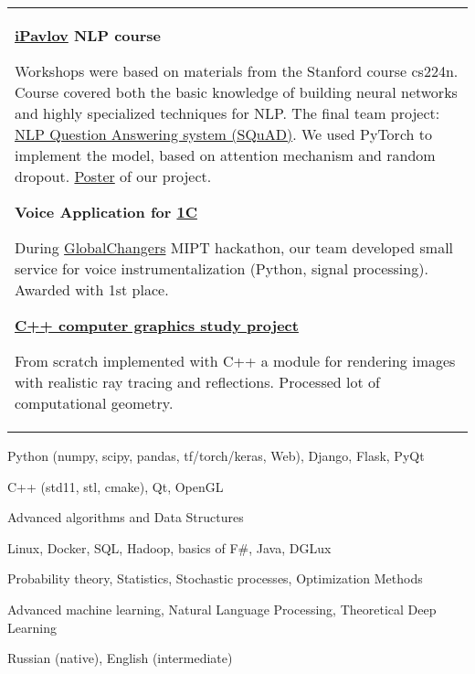 \documentclass[a4paper,12pt]{memoir} %
\newcommand{\opendialog}{\bluebullet}
\newcommand{\bullitem}[1]{\opendialog #1}
\begin{document}
	\begin{tabular}{p{} }
	\bullitem{ \textbf{\href{http://ipavlov.ai/\#edu}{iPavlov} NLP course} }
	
	Workshops were based on materials from the Stanford course cs224n. Course covered both the basic knowledge of building neural networks and highly specialized techniques for NLP. The final team project: \href{https://github.com/celidos/SQUAD_NLP}{NLP Question Answering system (SQuAD)}. We used PyTorch to implement the model, based on attention mechanism and random dropout. \href{https://github.com/celidos/SQUAD_NLP/blob/master/poster.pdf}{Poster} of our project.

	\SepSep
	\bullitem{\textbf{Voice Application for \href{http://1c.ru/eng/title.htm}{1C}}}
	
	During \href{https://github.com/celidos/hck_Global_Changers}{GlobalChangers} MIPT hackathon, our team developed small service for voice instrumentalization (Python, signal processing). Awarded with 1st place.\
	
	\SepSep
	\bullitem{\textbf{\href{https://github.com/celidos/programming-mipt-2015-2017/tree/master/RAY_TRACING}{C++ computer graphics study project}}} 
	
	From scratch implemented with C++ a module for rendering images with realistic ray tracing and reflections. Processed lot of computational geometry.
	
	\end{tabular}	

	\Sep
	
	
	\begin{figure*}[!htb]
	\begin{minipage}{0.45\textwidth}
		\begin{flushleft}
		
		\bullitem{Python (numpy, scipy, pandas, tf/torch/keras, Web), Django, Flask, PyQt}
		
		\bullitem{C++ (std11, stl, cmake), Qt, OpenGL}
		
		\bullitem{Advanced algorithms and Data Structures}
		
		\bullitem{Linux, Docker, SQL, Hadoop, basics of F\#, Java, DGLux}
	\end{flushleft}
	\end{minipage}\hfill	\begin{minipage}{0.45\textwidth}
		\begin{flushleft}
		
	\bullitem{Probability theory, Statistics, Stochastic processes, Optimization Methods}	
	
	\bullitem{Advanced machine learning, Natural Language Processing, Theoretical Deep Learning}
			
	\bullitem{Russian (native), English (intermediate)}
\end{flushleft}
	\end{minipage}	


\end{figure*}				
	
\end{document}
